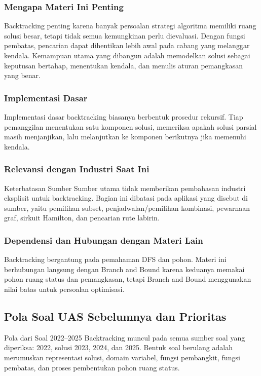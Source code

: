 \subsubsection{Mengapa Materi Ini Penting}
Backtracking penting karena banyak persoalan strategi algoritma memiliki ruang solusi besar, tetapi tidak semua kemungkinan perlu dievaluasi. Dengan fungsi pembatas, pencarian dapat dihentikan lebih awal pada cabang yang melanggar kendala. Kemampuan utama yang dibangun adalah memodelkan solusi sebagai keputusan bertahap, menentukan kendala, dan menulis aturan pemangkasan yang benar.

\subsubsection{Implementasi Dasar}
Implementasi dasar backtracking biasanya berbentuk prosedur rekursif. Tiap pemanggilan menentukan satu komponen solusi, memeriksa apakah solusi parsial masih menjanjikan, lalu melanjutkan ke komponen berikutnya jika memenuhi kendala.

\subsubsection{Relevansi dengan Industri Saat Ini}
\begin{cmt}{Keterbatasan Sumber}{}
Sumber utama tidak memberikan pembahasan industri eksplisit untuk backtracking. Bagian ini dibatasi pada aplikasi yang disebut di sumber, yaitu pemilihan subset, penjadwalan/pemilihan kombinasi, pewarnaan graf, sirkuit Hamilton, dan pencarian rute labirin.
\end{cmt}

\subsubsection{Dependensi dan Hubungan dengan Materi Lain}
Backtracking bergantung pada pemahaman DFS dan pohon. Materi ini berhubungan langsung dengan Branch and Bound karena keduanya memakai pohon ruang status dan pemangkasan, tetapi Branch and Bound menggunakan nilai batas untuk persoalan optimisasi.

\subsection{Pola Soal UAS Sebelumnya dan Prioritas}

\begin{cmt}{Pola dari Soal 2022--2025}{}
Backtracking muncul pada semua sumber soal yang diperiksa: 2022, solusi 2023, 2024, dan 2025. Bentuk soal berulang adalah merumuskan representasi solusi, domain variabel, fungsi pembangkit, fungsi pembatas, dan proses pembentukan pohon ruang status.
\end{cmt}

